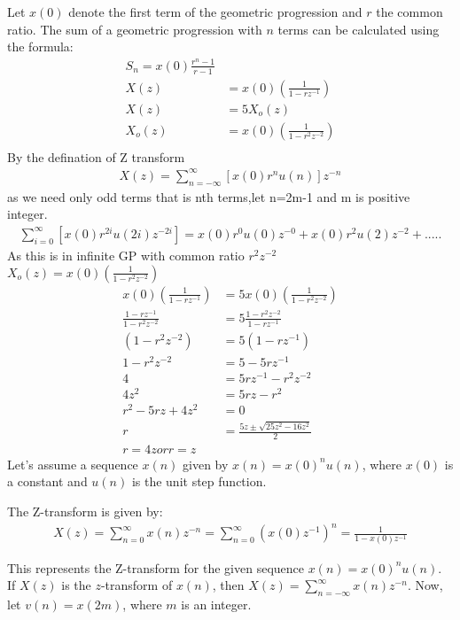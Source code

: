 \documentclass{article}
\begin{document}
Let \( x(0) \) denote the first term of the geometric progression and \( r \) the common ratio. The sum of a geometric progression with \( n \) terms can be calculated using the formula:
\begin{align}
 S_n = x(0) \frac{{r^n - 1}}{{r - 1}} \\
X(z) &= x(0)\left(\frac{1}{1 - rz^{-1}}\right) \\
X(z) &= 5 X_o(z) \\
X_o(z) &= x(0)\left(\frac{1}{1 - r^2z^{-2}}\right) \\
\end{align}
By the defination of Z transform 
\begin{align}
X(z)= \sum_{n=-\infty}^{\infty} [x(0)r^{n}u(n)]z^{-n}
\end{align}
as we need only odd terms that is nth terms,let n=2m-1 and m is positive integer.
\begin{align}
\sum_{i=0}^{\infty} [x(0)r^{2i}u(2i)z^{-2i}]=x(0)r^{0}u(0)z^{-0}+x(0)r^{2}u(2)z^{-2}+.....
\end{align}
As this is in infinite GP with common ratio $r^{2}z^{-2}$\\
$X_o(z)= x(0)\left(\frac{1}{1 - r^2z^{-2}}\right)$ \\
\begin{align}
x(0)\left(\frac{1}{1 - rz^{-1}}\right) &= 5 x(0)\left(\frac{1}{1 - r^2z^{-2}}\right) \\
\frac{1 - rz^{-1}}{1 - r^2z^{-2}} &= 5 \frac{1 - r^2z^{-2}}{1 - rz^{-1}} \\
(1 - r^2z^{-2}) &= 5 (1 - rz^{-1}) \\
1 - r^2z^{-2} &= 5 - 5rz^{-1} \\
4 &= 5rz^{-1} - r^2z^{-2} \\
4z^2 &= 5rz - r^2 \\
r^2 - 5rz + 4z^2 &= 0 \\
r &= \frac{5z \pm \sqrt{25z^2 - 16z^2}}{2}\\
r=4z or r=z
\end{align}
Let's assume a sequence \( x(n) \) given by \( x(n) =x(0)^n u(n) \), where \( x(0) \) is a constant and \( u(n) \) is the unit step function.

The Z-transform is given by:
\begin{align}
X(z) = \sum_{n=0}^{\infty} x(n)z^{-n} = \sum_{n=0}^{\infty} (x(0)z^{-1})^n = \frac{1}{1 - x(0)z^{-1}} 
\end{align}

This represents the Z-transform for the given sequence \( x(n) = x(0)^n u(n) \).\\
If \(X(z)\) is the \(z\)-transform of \(x(n)\), then \(X(z) = \sum_{n=-\infty}^{\infty} x(n)z^{-n}\). Now, let \(v(n)=x(2m)\), where \(m\) is an integer.
\end{document}
